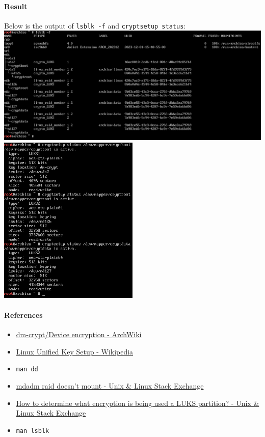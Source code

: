 \documentclass[12pt, a4paper]{article}
\begin{document}
  \paragraph{Result}
  Below is the output of \verb|lsblk -f| and \verb|cryptsetup status|:\\[1.5ex]
  \includegraphics[width=\textwidth]{3_result_lsblk.png}\\[1.5ex]
  \includegraphics[width=0.5\textwidth]{3_result_cryptsetup_status.png}

  \paragraph{References}
  \begin{itemize}
    \item \href{https://wiki.archlinux.org/title/dm-crypt/Device_encryption}{dm-crypt/Device encryption - ArchWiki}
    \item \href{https://en.wikipedia.org/wiki/Linux_Unified_Key_Setup}{Linux Unified Key Setup - Wikipedia}
    \item \verb|man dd|
    \item \href{https://unix.stackexchange.com/questions/148062/mdadm-raid-doesnt-mount}{mdadm raid doesn't mount - Unix \& Linux Stack Exchange}
    \item \href{https://unix.stackexchange.com/questions/260533/how-to-determine-what-encryption-is-being-used-a-luks-partition}{How to determine what encryption is being used a LUKS partition? - Unix \& Linux Stack Exchange}
    \item \verb|man lsblk|
  \end{itemize}
\end{document}
